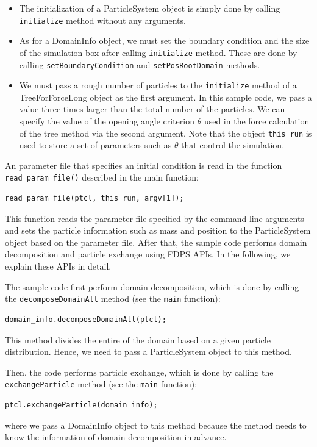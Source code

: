 \begin{itemize}[leftmargin=*,itemsep=-1ex]
\item The initialization of a \textsf{ParticleSystem} object is simply done by calling \texttt{initialize} method without any arguments.
\item As for a \textsf{DomainInfo} object, we must set the boundary condition and the size of the simulation box after calling \texttt{initialize} method. These are done by calling \texttt{setBoundaryCondition} and \texttt{setPosRootDomain} methods.
\item We must pass a rough number of particles to the \texttt{initialize} method of a \textsf{TreeForForceLong} object as the first argument. In this sample code, we pass a value three times larger than the total number of the particles. We can specify the value of the opening angle criterion $\theta$ used in the force calculation of the tree method via the second argument. Note that the object \texttt{this\_run} is used to store a set of parameters such as $\theta$ that control the simulation.
\end{itemize}


An parameter file that specifies an initial condition is read in the function \texttt{read\_param\_file()} described in the main function:
\begin{lstlisting}
read_param_file(ptcl, this_run, argv[1]);
\end{lstlisting}
This function reads the parameter file specified by the command line arguments and sets the particle information such as mass and position to the \textsf{ParticleSystem} object based on the parameter file. After that, the sample code performs domain decomposition and particle exchange using FDPS APIs. In the following, we explain these APIs in detail. 

The sample code first perform domain decomposition, which is done by calling the \texttt{decomposeDomainAll} method (see the \texttt{main} function):
\begin{lstlisting}[caption=Domain Decomposition]
domain_info.decomposeDomainAll(ptcl);
\end{lstlisting}
This method divides the entire of the domain based on a given particle distribution. Hence, we need to pass a \textsf{ParticleSystem} object to this method. 

Then, the code performs particle exchange, which is done by calling the \texttt{exchangeParticle} method (see the \texttt{main} function):
\begin{lstlisting}[caption=Particle Exchange]
ptcl.exchangeParticle(domain_info);
\end{lstlisting}
where we pass a \textsf{DomainInfo} object to this method because the method needs to know the information of domain decomposition in advance.

